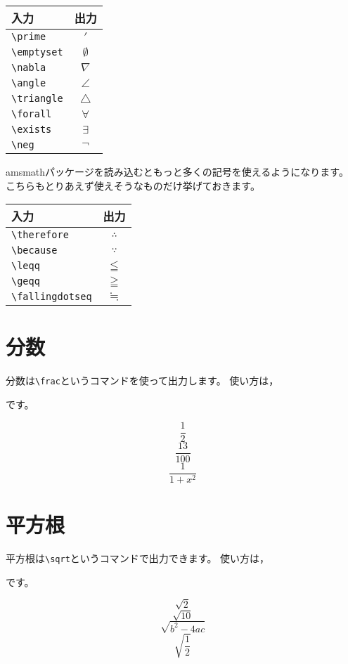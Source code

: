\begin{minipage}{0.25\hsize}
\begin{tabular}{lc}
入力 & 出力 \\ \hline
\verb|\prime| & $\prime$ \\
\verb|\emptyset| & $\emptyset$ \\
\verb|\nabla| & $\nabla$ \\
\verb|\angle| & $\angle$ \\
\verb|\triangle| & $\triangle$ \\
\verb|\forall| & $\forall$ \\
\verb|\exists| & $\exists$ \\
\verb|\neg| & $\neg$ \\
\end{tabular}
\end{minipage}

amsmathパッケージを読み込むともっと多くの記号を使えるようになります。
こちらもとりあえず使えそうなものだけ挙げておきます。

\begin{tabular}{lc}
入力 & 出力 \\ \hline
\verb|\therefore| & $\therefore$ \\
\verb|\because| & $\because$ \\
\verb|\leqq| & $\leqq$ \\
\verb|\geqq| & $\geqq$ \\
\verb|\fallingdotseq| & $\fallingdotseq$ \\
\end{tabular}




\section{分数}
分数は\verb|\frac|というコマンドを使って出力します。
使い方は，
\begin{ITeX}
\end{ITeX}
です。
\begin{IOTeX}
\[ \frac{1}{2} \]
\[ \frac{13}{100} \]
\[ \frac{1}{1 + x^2} \]
\end{IOTeX}



\section{平方根}
平方根は\verb|\sqrt|というコマンドで出力できます。
使い方は，
\begin{ITeX}
\end{ITeX}
です。
\begin{IOTeX}
\[ \sqrt{2} \]
\[ \sqrt{10} \]
\[ \sqrt{b^2 - 4ac} \]
\[ \sqrt{\frac{1}{2}} \]
\end{IOTeX}



